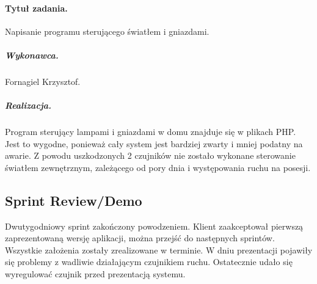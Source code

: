 	\paragraph{Tytuł zadania.} Napisanie programu sterującego światłem i gniazdami.
	\subparagraph{Wykonawca.} Fornagiel Krzysztof.
	\subparagraph{Realizacja.} Program sterujący lampami i gniazdami w domu znajduje się w plikach PHP. Jest to wygodne, ponieważ cały system jest bardziej zwarty i mniej podatny na awarie. Z powodu uszkodzonych 2 czujników nie zostało wykonane sterowanie światłem zewnętrznym, zależącego od pory dnia i występowania ruchu na posesji.

	
	\subsection{Sprint Review/Demo}
	Dwutygodniowy sprint zakończony powodzeniem. Klient zaakceptował pierwszą zaprezentowaną wersję aplikacji, można przejść do następnych sprintów. Wszystkie założenia zostały zrealizowane w terminie. W dniu prezentacji pojawiły się problemy z wadliwie działającym czujnikiem ruchu. Ostatecznie udało się wyregulować czujnik przed prezentacją systemu.
	